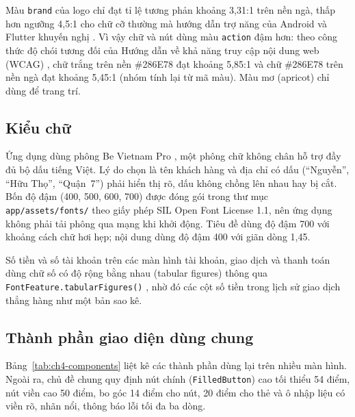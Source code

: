 Màu \texttt{brand} của logo chỉ đạt tỉ lệ tương phản khoảng 3,31:1 trên nền ngà, thấp hơn ngưỡng 4,5:1 cho chữ cỡ thường mà hướng dẫn trợ năng của Android và Flutter khuyến nghị \parencite{ch4-android-a11y,ch4-flutter-a11y}. Vì vậy chữ và nút dùng màu \texttt{action} đậm hơn: theo công thức độ chói tương đối của Hướng dẫn về khả năng truy cập nội dung web (WCAG) \parencite{ch4-wcag22}, chữ trắng trên nền \#286E78 đạt khoảng 5,85:1 và chữ \#286E78 trên nền ngà đạt khoảng 5,45:1 (nhóm tính lại từ mã màu). Màu mơ (apricot) chỉ dùng để trang trí.

\subsection{Kiểu chữ}
\label{sec:ch4-typography}

Ứng dụng dùng phông Be Vietnam Pro \parencite{ch4-bevietnampro}, một phông chữ không chân hỗ trợ đầy đủ bộ dấu tiếng Việt. Lý do chọn là tên khách hàng và địa chỉ có dấu (``Nguyễn'', ``Hữu Thọ'', ``Quận~7'') phải hiển thị rõ, dấu không chồng lên nhau hay bị cắt. Bốn độ đậm (400, 500, 600, 700) được đóng gói trong thư mục \texttt{app/\allowbreak{}assets/\allowbreak{}fonts/} theo giấy phép SIL Open Font License 1.1, nên ứng dụng không phải tải phông qua mạng khi khởi động. Tiêu đề dùng độ đậm 700 với khoảng cách chữ hơi hẹp; nội dung dùng độ đậm 400 với giãn dòng 1,45.

Số tiền và số tài khoản trên các màn hình tài khoản, giao dịch và thanh toán dùng chữ số có độ rộng bằng nhau (tabular figures) thông qua \texttt{FontFeature.\allowbreak{}tabular\allowbreak{}Figures()} \parencite{ch4-flutter-tabular}, nhờ đó các cột số tiền trong lịch sử giao dịch thẳng hàng như một bản sao kê.

\subsection{Thành phần giao diện dùng chung}
\label{sec:ch4-components}

Bảng~\ref{tab:ch4-components} liệt kê các thành phần dùng lại trên nhiều màn hình. Ngoài ra, chủ đề chung quy định nút chính (\texttt{FilledButton}) cao tối thiểu 54 điểm, nút viền cao 50 điểm, bo góc 14 điểm cho nút, 20 điểm cho thẻ và ô nhập liệu có viền rõ, nhãn nổi, thông báo lỗi tối đa ba dòng.

